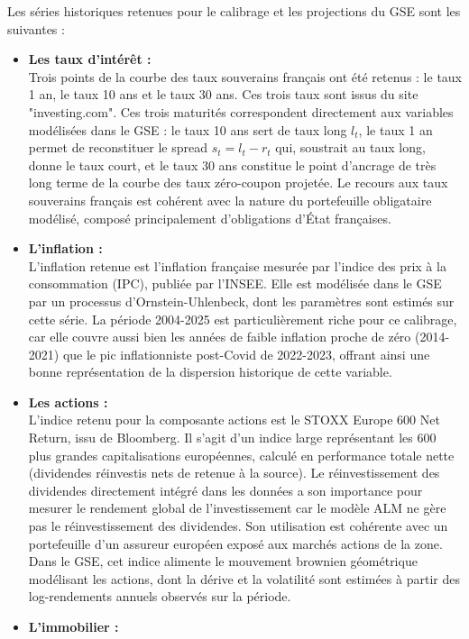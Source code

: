 Les séries historiques retenues pour le calibrage et les projections du GSE sont les suivantes :
\begin{itemize}
    \item \textbf{Les taux d'intérêt :} \\[0.3em]
    Trois points de la courbe des taux souverains français ont été retenus : le taux 1 an, le taux 10 ans et le taux 30 ans. Ces trois taux sont issus du site "investing.com". Ces trois maturités correspondent directement aux variables modélisées dans le GSE : le taux 10 ans sert de taux long $l_t$, le taux 1 an permet de reconstituer le spread $s_t = l_t - r_t$ qui, soustrait au taux long, donne le taux court, et le taux 30 ans constitue le point d'ancrage de très long terme de la courbe des taux zéro-coupon projetée. Le recours aux taux souverains français est cohérent avec la nature du portefeuille obligataire modélisé, composé principalement d'obligations d'État françaises.
    \item \textbf{L'inflation :} \\[0.3em]
    L'inflation retenue est l'inflation française mesurée par l'indice des prix à la consommation (IPC), publiée par l'INSEE. Elle est modélisée dans le GSE par un processus d'Ornstein-Uhlenbeck, dont les paramètres sont estimés sur cette série. La période 2004-2025 est particulièrement riche pour ce calibrage, car elle couvre aussi bien les années de faible inflation proche de zéro (2014-2021) que le pic inflationniste post-Covid de 2022-2023, offrant ainsi une bonne représentation de la dispersion historique de cette variable.
    \item \textbf{Les actions :} \\[0.3em]
    L'indice retenu pour la composante actions est le STOXX Europe 600 Net Return, issu de Bloomberg. Il s'agit d'un indice large représentant les 600 plus grandes capitalisations européennes, calculé en performance totale nette (dividendes réinvestis nets de retenue à la source). Le réinvestissement des dividendes directement intégré dans les données a son importance pour mesurer le rendement global de l'investissement car le modèle ALM ne gère pas le réinvestissement des dividendes. Son utilisation est cohérente avec un portefeuille d'un assureur européen exposé aux marchés actions de la zone. Dans le GSE, cet indice alimente le mouvement brownien géométrique modélisant les actions, dont la dérive et la volatilité sont estimées à partir des log-rendements annuels observés sur la période.
    \item \textbf{L'immobilier :} \\[0.3em]

\end{itemize}
